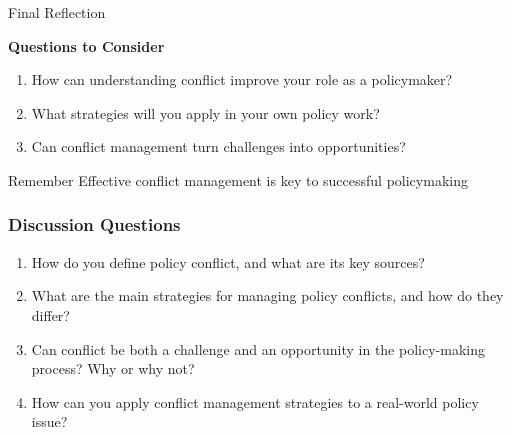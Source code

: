 \documentclass[10pt]{beamer}
\begin{document}
\begin{frame}{Final Reflection}
    \begin{center}
        \textbf{Questions to Consider}
        
        \bigskip
        
    \end{center}
    
    \begin{enumerate}
        \item How can understanding conflict improve your role as a policymaker?
        \item What strategies will you apply in your own policy work?
        \item Can conflict management turn challenges into opportunities?
    \end{enumerate}
    
    \begin{alertblock}{Remember}
        Effective conflict management is key to successful policymaking
    \end{alertblock}
\end{frame}

    \begin{frame}
    \frametitle{Discussion Questions}
    
    \begin{enumerate}
        \item How do you define policy conflict, and what are its key sources?
        \item What are the main strategies for managing policy conflicts, and how do they differ?
        \item Can conflict be both a challenge and an opportunity in the policy-making process? Why or why not?
        \item How can you apply conflict management strategies to a real-world policy issue?
    \end{enumerate}
    \end{frame}
\end{document}
